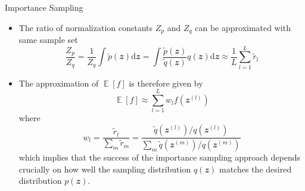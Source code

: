 \documentclass{bredelebeamer}
\DeclareMathOperator*{\E}{\mathbb{E}}
\begin{document}
\begin{frame}{Importance Sampling}
  \begin{itemize}
    \item The ratio of normalization constants $Z_p$ and $Z_q$ can be
    approximated with same sample set
    \begin{equation}
      \frac{Z_p}{Z_q}
      = \frac{1}{Z_q} \int \tilde{p}(\mathbfit{z}) \mathrm{d}\mathbfit{z}
      = \int \frac{\tilde{p}(\mathbfit{z})}{\tilde{q}(\mathbfit{z})} q(\mathbfit{z}) \mathrm{d}\mathbfit{z}
      \approx \frac{1}{L} \sum_{l=1}^{L} \tilde{r}_l
    \end{equation}
    \item The approximation of $\E[f]$ is therefore given by
    \begin{equation}
      \E[f] \approx \sum_{l=1}^{L} w_l f(\mathbfit{z}^{(l)})
    \end{equation}
    where
    \begin{equation}
      w_l
      = \frac{\tilde{r}_l}{\sum_{m} \tilde{r}_m}
      = \frac{\tilde{q}(\mathbfit{z}^{(l)})/q(\mathbfit{z}^{(l)})}{\sum_m \tilde{q}(\mathbfit{z}^{(m)})/q(\mathbfit{z}^{(m)})}
    \end{equation}
    which implies that the success of the importance sampling approach depends
    crucially on how well the sampling distribution $q(\mathbfit{z})$ matches
    the desired distribution $p(\mathbfit{z})$.
  \end{itemize}
\end{frame}
\end{document}
